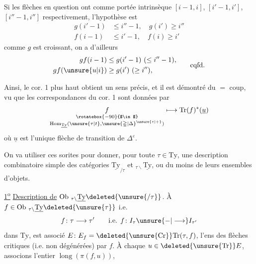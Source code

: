  Si les flèches en question ont comme portée
intrinsèque $[i-1,i]$, $[i'-1,i']$, $[i''-1,i'']$ respectivement,
l'hypothèse est
\[
\begin{aligned}
 g(i'-1)&\leq i''-1,\quad g(i')\geq i''\\
 f(i-1)&\leq i'-1,\quad f(i)\geq i'
\end{aligned}
\]
 comme $g$ est croissant, on a d'ailleurs
\[
\begin{aligned}
 gf(i-1)&\leq g(i'-1)\ (\leq i''-1),\\
 gf(\unsure{u|i})&\geq g(i')\ (\geq i''),
\end{aligned}
\qquad\text{cqfd.}
\]

Ainsi, le cor. 1 plus haut obtient un sens précis,
et il est démontré du $=$ coup, vu que les
correspondances du cor. 1 sont données par
\[
\underset{\substack{\rotatebox{-90}{$\in$}\\
\operatorname{Hom}_{\underline{\mathrm{Ty}}}(\unsure{\tau|t},\unsure{\mathbb{\Delta}|\Delta}^{\unsure{\varepsilon|+}})}}{f}
\longmapsto\mathrm{Tr}(f)^*(\underline{u})
\]
où $\underline{u}$ est l'unique flèche de transition de $\mathbb{\Delta}^\varepsilon$.

On va utiliser ces sorites pour donner,
pour toute $\tau\in\mathrm{Ty}$, une description combinatoire
simple des catégories $\underline{\mathrm{Ty}}_{/\tau}$ et $ {}_{\tau\backslash}\underline{\mathrm{Ty}}$, ou du
moins de leurs ensembles d'objets.

\uline{1\textsuperscript{o}} \uline{Description de} $\operatorname{Ob}\,{}_{\tau\backslash}\underline{\mathrm{Ty}}\deleted{\unsure{/\tau}}$.
À $f\in\operatorname{Ob}\,{}_{\tau\backslash}\underline{\mathrm{Ty}}\deleted{\unsure{\tau}}$ i.e.
\[
 f\colon\tau\longrightarrow\tau'\qquad\text{i.e. } f\colon I_\tau\unsure{\mathbin{-}|\longrightarrow}I_{\tau'}
\]
dans $\underline{\mathrm{Ty}}$, est associé $E\colon E_f=\deleted{\unsure{\mathrm{Cr}}}\mathrm{Tr}(\tau,f)$, l'ens des flèches
 critiques (i.e. non dégénérées) par $f$. À chaque
$u\in\deleted{\unsure{\mathrm{Tr}}}E$, associons l'entier $\operatorname{long}(\pi(f,u))$,
